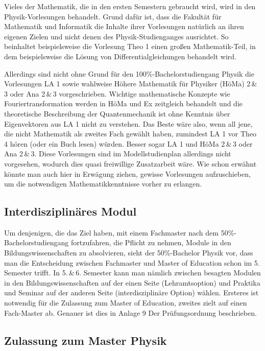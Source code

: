 Vieles der Mathematik, die in den ersten Semestern gebraucht wird, wird in den Physik-Vorlesungen behandelt. Grund dafür ist, dass die Fakultät für Mathematik und Informatik die Inhalte ihrer Vorlesungen natürlich an ihren eigenen Zielen und nicht denen des Physik-Studienganges ausrichtet. So beinhaltet beispielsweise die Vorlesung Theo 1 einen großen Mathematik-Teil, in dem beispielsweise die Lösung von Differentialgleichungen behandelt wird. 

Allerdings sind nicht ohne Grund für den 100\%-Bachelorstudiengang Physik die Vorlesungen LA 1 sowie wahlweise Höhere Mathematik für Physiker (HöMa) 2\,\&\,3 oder Ana 2\,\&\,3 vorgeschrieben. Wichtige mathematische Konzepte wie Fouriertransformation werden in HöMa und Ex zeitgleich behandelt und die theoretische Beschreibung der Quantenmechanik ist ohne Kenntnis über Eigenvektoren aus LA 1 nicht zu verstehen. Das Beste wäre also, wenn all jene, die nicht Mathematik als zweites Fach gewählt haben, zumindest LA 1 vor Theo 4 hören (oder ein Buch lesen) würden. Besser sogar LA 1 und HöMa 2\,\&\,3 oder Ana 2\,\&\,3. Diese Vorlesungen sind im Modellstudienplan allerdings nicht vorgesehen, wodurch dies quasi freiwillige Zusatzarbeit wäre. Wie schon erwähnt könnte man auch hier in Erwägung ziehen, gewisse Vorlesungen aufzuschieben, um die notwendigen Mathematikkenntnisse vorher zu erlangen.


\subsection{Interdisziplinäres Modul}

Um denjenigen, die das Ziel haben, mit einem Fachmaster nach dem 50\%-Bachelorstudiengang fortzufahren, die Pflicht zu nehmen, Module in den Bildungswissenschaften zu absolvieren, sieht der 50\%-Bachelor Physik vor, dass man die Entscheidung zwischen Fachmaster und Master of Education schon im 5. Semester trifft. In 5.\,\&\,6. Semester kann man nämlich zwischen besagten Modulen in den Bildungswissenschaften auf der einen Seite (Lehramtsoption) und Praktika und Seminar auf der anderen Seite (interdisziplinäre Option) wählen. Ersteres ist notwendig für die Zulassung zum Master of Education, zweites zielt auf einen Fach-Master ab. Genauer ist dies in Anlage 9 Der Prüfungsordnung beschrieben.


\subsection{Zulassung zum Master Physik}

